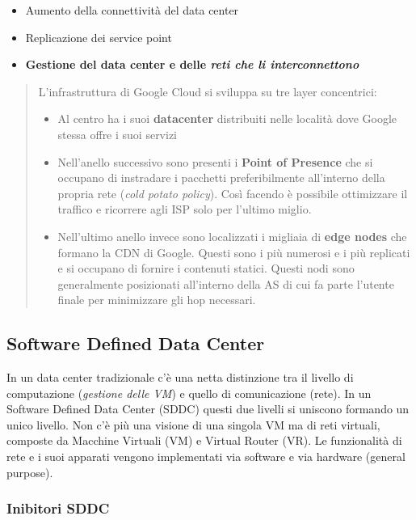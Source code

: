 \documentclass{article}
\providecommand{\tightlist}{%
		  \setlength{\itemsep}{0pt}\setlength{\parskip}{0pt}}
\begin{document}
		\begin{itemize}
		\tightlist
		\item
		  Aumento della connettività del data center
		\item
		  Replicazione dei service point
		\item
		  \textbf{Gestione del data center e delle \emph{reti che li
		  interconnettono}}
		\end{itemize}
		
		\begin{quote}
		L'infrastruttura di Google Cloud si sviluppa su tre layer concentrici:
		\begin{itemize}
			\item Al centro ha i suoi \textbf{datacenter} distribuiti nelle località dove Google stessa offre i suoi servizi
			\item Nell'anello successivo sono presenti i \textbf{Point of Presence} che si occupano di instradare i pacchetti preferibilmente all'interno della propria rete (\textit{cold potato policy}). Così facendo è possibile ottimizzare il traffico e ricorrere agli ISP solo per l'ultimo miglio.
			\item Nell'ultimo anello invece sono localizzati i migliaia di \textbf{edge nodes} che formano la CDN di Google. Questi sono i più numerosi e i più replicati e si occupano di fornire i contenuti statici. Questi nodi sono generalmente posizionati all'interno della AS di cui fa parte l'utente finale per minimizzare gli hop necessari.
		\end{itemize} 
		\end{quote}
		
		\subsection{Software Defined Data Center}
		
		In un data center tradizionale c'è una netta distinzione tra il livello di computazione (\emph{gestione delle VM}) e quello di comunicazione (rete). In un Software Defined Data Center (SDDC) questi due livelli si uniscono formando un unico livello. Non c'è	più una visione di una singola VM ma di reti virtuali, composte da Macchine Virtuali (VM) e Virtual Router (VR). Le funzionalità di rete e i suoi apparati vengono implementati via software e via hardware (general purpose).
		
		\subsubsection{Inibitori SDDC}\label{inibitori-sddc}
		
\end{document}
